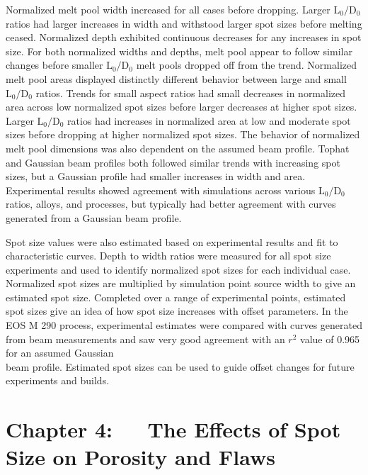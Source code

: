 \documentclass[10pt]{article}
\begin{document}
Normalized melt pool width increased for all cases before dropping. Larger $\mathrm{L}_{0} / \mathrm{D}_{0}$ ratios had larger increases in width and withstood larger spot sizes before melting ceased. Normalized depth exhibited continuous decreases for any increases in spot size. For both normalized widths and depths, melt pool appear to follow similar changes before smaller $\mathrm{L}_{0} / \mathrm{D}_{0}$ melt pools dropped off from the trend. Normalized melt pool areas displayed distinctly different behavior between large and small $\mathrm{L}_{0} / \mathrm{D}_{0}$ ratios. Trends for small aspect ratios had small decreases in normalized area across low normalized spot sizes before larger decreases at higher spot sizes. Larger $\mathrm{L}_{0} / \mathrm{D}_{0}$ ratios had increases in normalized area at low and moderate spot sizes before dropping at higher normalized spot sizes. The behavior of normalized melt pool dimensions was also dependent on the assumed beam profile. Tophat and Gaussian beam profiles both followed similar trends with increasing spot sizes, but a Gaussian profile had smaller increases in width and area. Experimental results showed agreement with simulations across various $\mathrm{L}_{0} / \mathrm{D}_{0}$ ratios, alloys, and processes, but typically had better agreement with curves generated from a Gaussian beam profile.

Spot size values were also estimated based on experimental results and fit to characteristic curves. Depth to width ratios were measured for all spot size experiments and used to identify normalized spot sizes for each individual case. Normalized spot sizes are multiplied by simulation point source width to give an estimated spot size. Completed over a range of experimental points, estimated spot sizes give an idea of how spot size increases with offset parameters. In the EOS M 290 process, experimental estimates were compared with curves generated from beam measurements and saw very good agreement with an $r^{2}$ value of 0.965 for an assumed Gaussian\\
beam profile. Estimated spot sizes can be used to guide offset changes for future experiments and builds.

\section*{Chapter 4: $\quad$ The Effects of Spot Size on Porosity and Flaws}
\end{document}
